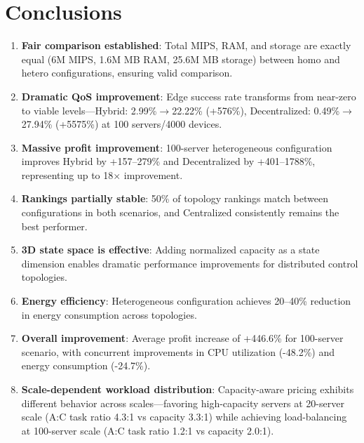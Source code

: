 \documentclass[conference]{IEEEtran}
\begin{document}
\section{Conclusions}

\begin{enumerate}
    \item \textbf{Fair comparison established}: Total MIPS, RAM, and storage are exactly equal (6M MIPS, 1.6M MB RAM, 25.6M MB storage) between homo and hetero configurations, ensuring valid comparison.

    \item \textbf{Dramatic QoS improvement}: Edge success rate transforms from near-zero to viable levels---Hybrid: 2.99\%$\rightarrow$22.22\% (+576\%), Decentralized: 0.49\%$\rightarrow$27.94\% (+5575\%) at 100 servers/4000 devices.

    \item \textbf{Massive profit improvement}: 100-server heterogeneous configuration improves Hybrid by +157--279\% and Decentralized by +401--1788\%, representing up to 18$\times$ improvement.

    \item \textbf{Rankings partially stable}: 50\% of topology rankings match between configurations in both scenarios, and Centralized consistently remains the best performer.

    \item \textbf{3D state space is effective}: Adding normalized capacity as a state dimension enables dramatic performance improvements for distributed control topologies.

    \item \textbf{Energy efficiency}: Heterogeneous configuration achieves 20--40\% reduction in energy consumption across topologies.

    \item \textbf{Overall improvement}: Average profit increase of +446.6\% for 100-server scenario, with concurrent improvements in CPU utilization (-48.2\%) and energy consumption (-24.7\%).

    \item \textbf{Scale-dependent workload distribution}: Capacity-aware pricing exhibits different behavior across scales---favoring high-capacity servers at 20-server scale (A:C task ratio 4.3:1 vs capacity 3.3:1) while achieving load-balancing at 100-server scale (A:C task ratio 1.2:1 vs capacity 2.0:1).
\end{enumerate}
\end{document}
